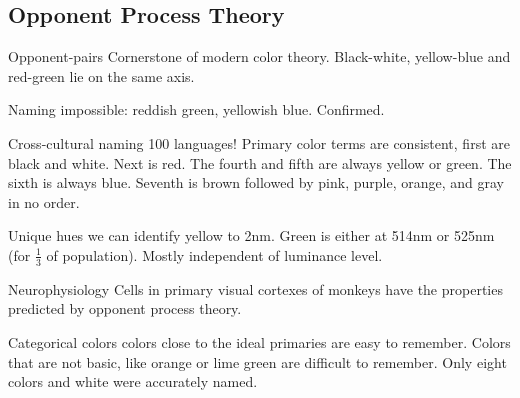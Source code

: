 \begin{mdframed}\begin{multicols}{2}
\subsection{Opponent Process Theory}
\begin{compactdesc}
    \item[Opponent-pairs] Cornerstone of modern color theory.
        Black-white, yellow-blue and red-green lie on the same axis.
    \item[Naming] impossible: reddish green, yellowish blue. Confirmed.
    \item[Cross-cultural naming] 100 languages! Primary color terms are
        consistent, first are black and white. Next is red. The fourth and
        fifth are always yellow or green. The sixth is always blue. Seventh is
        brown followed by pink, purple, orange, and gray in no order.
    \item[Unique hues] we can identify yellow to 2nm. Green is either at 514nm
        or 525nm (for $\frac{1}{3}$ of population). Mostly independent of
        luminance level.
    \item[Neurophysiology] Cells in primary visual cortexes of monkeys have the
        properties predicted by opponent process theory.
    \item[Categorical colors] colors close to the ideal primaries are easy to
        remember. Colors that are not basic, like orange or lime  green are
        difficult to remember. Only eight colors and white were accurately named.
\end{compactdesc}
\end{multicols}\end{mdframed}


